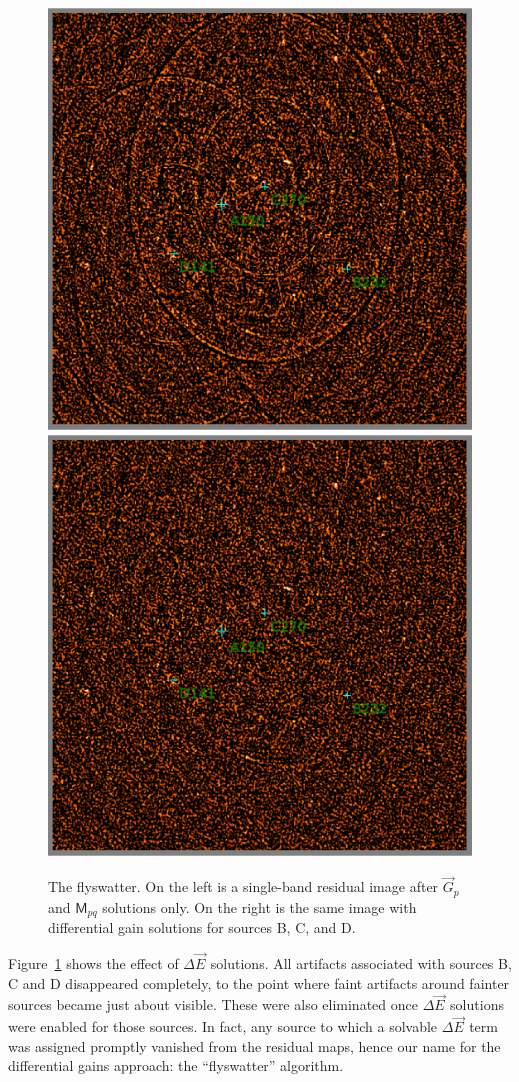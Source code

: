 \documentclass[]{aa}
\newcommand{\jones}[2]{\vec {#1}_{#2}}
\newcommand{\coh}[2]{\mathsf{{#1}}_{{#2}}}
\begin{document}
\begin{figure}
\begin{centering}
\includegraphics[width=.5\columnwidth]{before_dE}%
\includegraphics[width=.5\columnwidth]{after_dE}\par
\end{centering}
\caption{\label{fig:dEsol}The flyswatter. On the left is a single-band residual image after  $\jones{G}{p}$ and $\coh{M}{pq}$ solutions only. On the right is the same image with differential gain solutions for sources B, C, and D.}
\end{figure}

Figure~\ref{fig:dEsol} shows the effect of $\Delta\jones{E}{}$ solutions. All artifacts associated with sources B, C and D disappeared completely, to the point where faint artifacts around fainter sources became just about visible.  These were also eliminated once $\Delta\jones{E}{}$ solutions were enabled for those sources. In fact, any source to which a solvable $\Delta\jones{E}{}$ term was assigned promptly vanished from the residual maps, hence our name for the differential gains approach: the ``flyswatter'' algorithm. 
\end{document}
